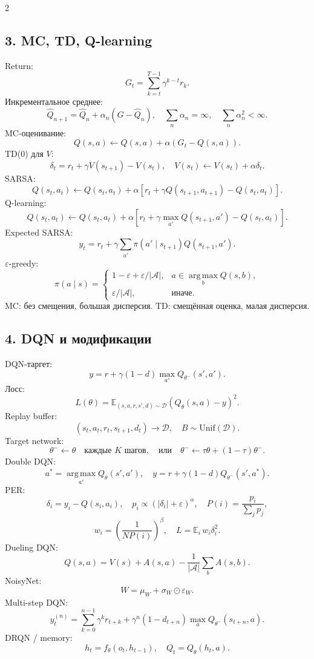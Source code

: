 \documentclass[8pt,a4paper]{extarticle}
\newcommand{\E}{\mathbb E}
\newcommand{\argmax}{\operatorname*{arg\,max}}
\newcommand{\cA}{\mathcal A}
\newcommand{\cD}{\mathcal D}
\newcommand{\1}{\mathbf 1}
\begin{document}
\begin{multicols*}{2}
\subsection*{3. MC, TD, Q-learning}
Return:
\[
G_t=\sum_{k=t}^{T-1}\gamma^{k-t}r_k.
\]
Инкрементальное среднее:
\[
\hat Q_{n+1}=\hat Q_n+\alpha_n(G-\hat Q_n),
\quad
\sum_n\alpha_n=\infty,
\quad
\sum_n\alpha_n^2<\infty.
\]
MC-оценивание:
\[
Q(s,a)\leftarrow Q(s,a)+\alpha\left(G_t-Q(s,a)\right).
\]
TD(0) для $V$:
\[
\delta_t=r_t+\gamma V(s_{t+1})-V(s_t),
\quad
V(s_t)\leftarrow V(s_t)+\alpha\delta_t.
\]
SARSA:
\[
Q(s_t,a_t)\leftarrow Q(s_t,a_t)+\alpha\left[r_t+\gamma Q(s_{t+1},a_{t+1})-Q(s_t,a_t)\right].
\]
Q-learning:
\[
Q(s_t,a_t)\leftarrow Q(s_t,a_t)+\alpha\left[r_t+\gamma\max_{a'}Q(s_{t+1},a')-Q(s_t,a_t)\right].
\]
Expected SARSA:
\[
y_t=r_t+\gamma\sum_{a'}\pi(a'\mid s_{t+1})Q(s_{t+1},a').
\]
$\varepsilon$-greedy:
\[
\pi(a\mid s)=
\begin{cases}
1-\varepsilon+\varepsilon/|\cA|,&a\in\argmax_b Q(s,b),\\
\varepsilon/|\cA|,&\text{иначе.}
\end{cases}
\]
MC: без смещения, большая дисперсия. TD: смещённая оценка, малая дисперсия.

\subsection*{4. DQN и модификации}
DQN-таргет:
\[
y=r+\gamma(1-d)\max_{a'}Q_{\theta^-}(s',a').
\]
Лосс:
\[
L(\theta)=\E_{(s,a,r,s',d)\sim\cD}\left(Q_\theta(s,a)-y\right)^2.
\]
Replay buffer:
\[
(s_t,a_t,r_t,s_{t+1},d_t)\to\cD,
\quad B\sim\mathrm{Unif}(\cD).
\]
Target network:
\[
\theta^-\leftarrow\theta \quad\text{каждые }K\text{ шагов},
\quad\text{или}\quad \theta^-\leftarrow \tau\theta+(1-\tau)\theta^-.
\]
Double DQN:
\[
a^*=\argmax_{a'}Q_\theta(s',a'),
\quad y=r+\gamma(1-d)Q_{\theta^-}(s',a^*).
\]
PER:
\[
\delta_i=y_i-Q(s_i,a_i),\quad
p_i\propto(|\delta_i|+\varepsilon)^\alpha,
\quad P(i)=\frac{p_i}{\sum_jp_j},
\]
\[
w_i=\left(\frac1{N P(i)}\right)^\beta,
\quad L=\E_i\, w_i\delta_i^2.
\]
Dueling DQN:
\[
Q(s,a)=V(s)+A(s,a)-\frac1{|\cA|}\sum_{b}A(s,b).
\]
NoisyNet:
\[
W=\mu_W+\sigma_W\odot\varepsilon_W.
\]
Multi-step DQN:
\[
y_t^{(n)}=\sum_{k=0}^{n-1}\gamma^k r_{t+k}+\gamma^n(1-d_{t+n})\max_a Q_{\theta^-}(s_{t+n},a).
\]
DRQN / memory:
\[
h_t=f_\theta(o_t,h_{t-1}),\quad Q_t=Q_\theta(h_t,a).
\]


\end{multicols*}
\end{document}
